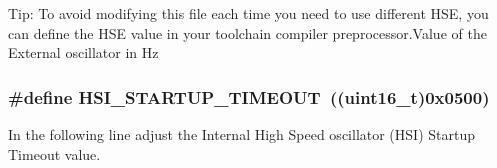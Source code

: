 Tip\-: To avoid modifying this file each time you need to use different H\-S\-E, you can define the H\-S\-E value in your toolchain compiler preprocessor.\-Value of the External oscillator in Hz \hypertarget{group___library__configuration__section_ga83f109da654b670743786c6a45284b96}{
\subsubsection[{H\-S\-I\-\_\-\-S\-T\-A\-R\-T\-U\-P\-\_\-\-T\-I\-M\-E\-O\-U\-T}]{\setlength{\rightskip}{0pt plus 5cm}\#define H\-S\-I\-\_\-\-S\-T\-A\-R\-T\-U\-P\-\_\-\-T\-I\-M\-E\-O\-U\-T~((uint16\-\_\-t)0x0500)}}\label{group___library__configuration__section_ga83f109da654b670743786c6a45284b96}


In the following line adjust the Internal High Speed oscillator (H\-S\-I) Startup Timeout value. 

